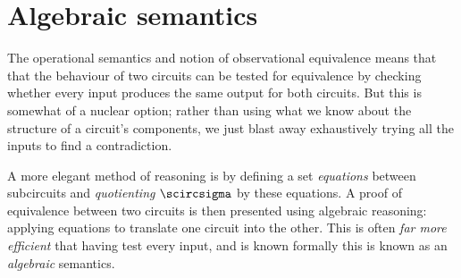 \chapter{Algebraic semantics}

The operational semantics and notion of observational equivalence means that
that the behaviour of two circuits can be tested for equivalence by checking
whether every input produces the same output for both circuits.
But this is somewhat of a nuclear option; rather than using what we know
about the structure of a circuit's components, we just blast away
exhaustively trying all the inputs to find a contradiction.

A more elegant method of reasoning is by defining a set \emph{equations} between
subcircuits and \emph{quotienting} \(\scircsigma\) by these equations.
A proof of equivalence between two circuits is then presented using algebraic
reasoning: applying equations to translate one circuit into the other.
This is often \emph{far more efficient} that having test every input, and is
known formally this is known as an \emph{algebraic} semantics.


